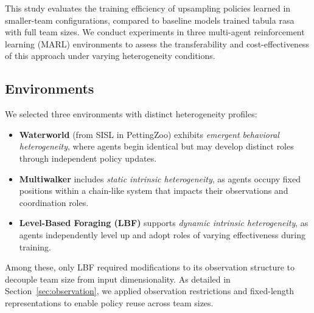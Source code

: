\documentclass{article}
\begin{document}

This study evaluates the training efficiency of upsampling policies learned in smaller-team configurations, compared to baseline models trained tabula rasa with full team sizes. We conduct experiments in three multi-agent reinforcement learning (MARL) environments to assess the transferability and cost-effectiveness of this approach under varying heterogeneity conditions.

\subsection{Environments}

We selected three environments with distinct heterogeneity profiles:
\begin{itemize}
    \item \textbf{Waterworld} \cite{gupta2017} (from SISL in PettingZoo) exhibits \emph{emergent behavioral heterogeneity}, where agents begin identical but may develop distinct roles through independent policy updates.
    \item \textbf{Multiwalker} \cite{gupta2017} includes \emph{static intrinsic heterogeneity}, as agents occupy fixed positions within a chain-like system that impacts their observations and coordination roles.
    \item \textbf{Level-Based Foraging (LBF)} \cite{papoudakis2021} supports \emph{dynamic intrinsic heterogeneity}, as agents independently level up and adopt roles of varying effectiveness during training.
\end{itemize}

Among these, only LBF required modifications to its observation structure to decouple team size from input dimensionality. As detailed in Section~\ref{sec:observation}, we applied observation restrictions and fixed-length representations to enable policy reuse across team sizes.
\end{document}
